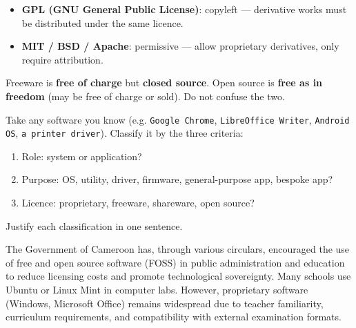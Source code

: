 \documentclass[11pt]{article}
\newcounter{popsec}
\newcounter{popsub}
\newcommand{\courssub}[1]{%
  \stepcounter{popsub}%
  \par\vspace{9pt}\noindent{\popxbold\fontsize{11.5}{13}\selectfont\color{popink}{\color{poporange}\thepopsec.\thepopsub}\hspace{6pt}#1}\par\nopagebreak\vspace{4pt}
}
\begin{document}
\begin{propriete}
\begin{itemize}
\item \textbf{GPL (GNU General Public License)}: copyleft — derivative works must be distributed under the same licence.
\item \textbf{MIT / BSD / Apache}: permissive — allow proprietary derivatives, only require attribution.
\end{itemize}
\end{propriete}

\begin{attention}
Freeware is \textbf{free of charge} but \textbf{closed source}. Open source is \textbf{free as in freedom} (may be free of charge or sold). Do not confuse the two.
\end{attention}

\begin{experience}
Take any software you know (e.g. \texttt{Google Chrome}, \texttt{LibreOffice Writer}, \texttt{Android OS}, \texttt{a printer driver}). Classify it by the three criteria:
\begin{enumerate}
\item Role: system or application?
\item Purpose: OS, utility, driver, firmware, general-purpose app, bespoke app?
\item Licence: proprietary, freeware, shareware, open source?
\end{enumerate}
Justify each classification in one sentence.
\end{experience}

\begin{savaistu}
The Government of Cameroon has, through various circulars, encouraged the use of free and open source software (FOSS) in public administration and education to reduce licensing costs and promote technological sovereignty. Many schools use Ubuntu or Linux Mint in computer labs. However, proprietary software (Windows, Microsoft Office) remains widespread due to teacher familiarity, curriculum requirements, and compatibility with external examination formats.
\end{savaistu}

\courssub{I check my knowledge}
\end{document}
